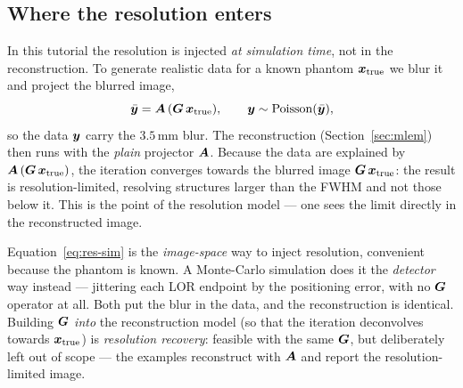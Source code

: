 \subsection{Where the resolution enters}
\label{sec:resolution:where}

In this tutorial the resolution is injected \emph{at simulation time}, not in
the reconstruction. To generate realistic data for a known phantom
$\bm{x}_{\mathrm{true}}$ we blur it and project the blurred image,
\begin{equation}
  \bar{\bm{y}} = \bm{A}\,(\bm{G}\,\bm{x}_{\mathrm{true}}),
  \qquad
  \bm{y} \sim \mathrm{Poisson}(\bar{\bm{y}}),
  \label{eq:res-sim}
\end{equation}
so the data $\bm{y}$ carry the $3.5\,\mathrm{mm}$ blur. The reconstruction
(Section~\ref{sec:mlem}) then runs with the \emph{plain} projector $\bm{A}$.
Because the data are explained by $\bm{A}\,(\bm{G}\,\bm{x}_{\mathrm{true}})$, the
iteration converges towards the blurred image $\bm{G}\,\bm{x}_{\mathrm{true}}$: the
result is resolution-limited, resolving structures larger than the FWHM and not
those below it. This is the point of the resolution model --- one sees the limit
directly in the reconstructed image.

\begin{remark}
Equation~\eqref{eq:res-sim} is the \emph{image-space} way to inject resolution,
convenient because the phantom is known. A Monte-Carlo simulation does it the
\emph{detector} way instead --- jittering each LOR endpoint by the positioning
error, with no $\bm{G}$ operator at all. Both put the blur in the data, and the
reconstruction is identical. Building $\bm{G}$ \emph{into} the reconstruction
model (so that the iteration deconvolves towards $\bm{x}_{\mathrm{true}}$) is
\emph{resolution recovery}: feasible with the same $\bm{G}$, but deliberately left
out of scope --- the examples reconstruct with $\bm{A}$ and report the
resolution-limited image.
\end{remark}
